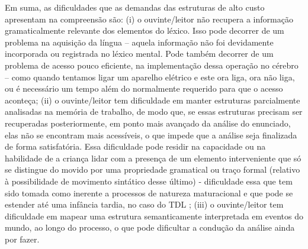 \documentclass[output=paper,colorlinks,citecolor=brown,booklanguage=portuguese]{langscibook}
\begin{document}
Em suma, as dificuldades que as demandas das estruturas de alto custo apresentam na compreensão são: (i) o ouvinte/leitor não recupera a informação gramaticalmente relevante dos elementos do léxico. Isso pode decorrer de um problema na aquisição da língua – aquela informação não foi devidamente incorporada ou registrada no léxico mental. Pode também decorrer de um problema de acesso pouco eficiente, na implementação dessa operação no cérebro – como quando tentamos ligar um aparelho elétrico e este ora liga, ora não liga, ou é necessário um tempo além do normalmente requerido para que o acesso aconteça; (ii) o ouvinte/leitor tem dificuldade em manter estruturas parcialmente analisadas na memória de trabalho, de modo que, se essas estruturas precisam ser recuperadas posteriormente, em ponto mais avançado da análise do enunciado, elas não se encontram mais acessíveis, o que impede que a análise seja finalizada de forma satisfatória. Essa dificuldade pode residir na capacidade ou na habilidade de a criança lidar com a presença de um elemento interveniente que só se distingue do movido por uma propriedade gramatical ou traço formal (relativo à possibilidade de movimento sintático desse último) - dificuldade essa que tem sido tomada como inerente a processos de natureza maturacional e que pode se estender até uma infância tardia, no caso do TDL \citep{Friedmann2009}; (iii) o ouvinte/leitor tem dificuldade em mapear uma estrutura semanticamente interpretada em eventos do mundo, ao longo do processo, o que pode dificultar a condução da análise ainda por fazer. 
\end{document}
